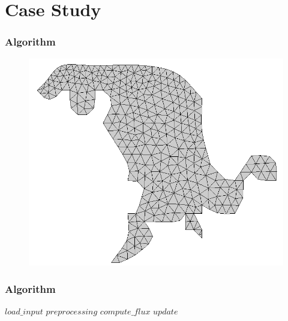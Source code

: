 \section{Case Study}

\begin{frame}
	\frametitle{Algorithm}
	\begin{figure}
		\centering
		\includegraphics[width=0.75\columnwidth]{images/foz_msh.png}
	\end{figure}
\end{frame}

\begin{frame}
	\frametitle{Algorithm}

	\begin{algorithmic}
		\State $load\_input$
		\State $preprocessing$
			\State $compute\_flux$
			\State $update$
		\EndWhile
	\end{algorithmic}
\end{frame}

